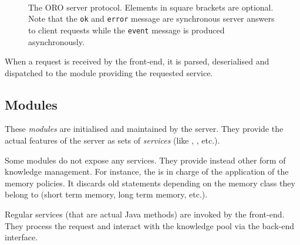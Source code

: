 \begin{figure}
\centering

 \\

\caption{The ORO server protocol. Elements in square brackets are optional.
Note that the {\tt ok} and {\tt error} message are synchronous server answers
to client requests while the {\tt event} message is produced asynchronously.}

\label{fig|oro-protocol}

\end{figure}


When a request is received by the front-end, it is parsed, deserialised and
dispatched to the module providing the requested service.

\subsection{Modules}

These \emph{modules} are initialised and maintained by the server. They provide
the actual features of the server as sets of \emph{services} (like ,
, etc.).

Some modules do not expose any services. They provide instead other form of
knowledge management. For instance, the  is in charge of
the application of the memory policies. It discards old statements depending on
the memory class they belong to (short term memory, long term memory, etc.).

Regular services (\ie that are actual Java methods) are invoked by the
front-end.  They process the request and interact with the knowledge pool via
the back-end interface.

